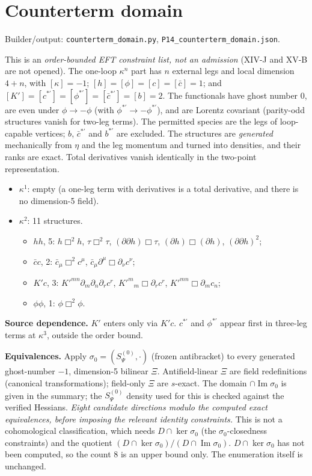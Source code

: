 \section{Counterterm domain}\label{sec:p14-ct}
\noindent Builder/output: \texttt{counterterm\_domain.py}, \texttt{P14\_counterterm\_domain.json}.\par\smallskip
This is an \emph{order-bounded EFT constraint list, not an admission} (XIV-J and XV-B are not opened). The one-loop
$\kappa^n$ part has $n$ external legs and local dimension $4+n$, with $[\kappa]=-1$; $[h]=[\phi]=[c]=[\bar c]=1$; and
$[K']=[c^{*\prime}]=[\phi^{*\prime}]=[\bar c^{*\prime}]=[b]=2$. The functionals have ghost number 0, are even under
$\phi\to-\phi$ (with $\phi^{*\prime}\to-\phi^{*\prime}$), and are Lorentz covariant (parity-odd structures vanish for
two-leg terms). The permitted species are the legs of loop-capable vertices; $b$, $\bar c^{*\prime}$ and $b^{*\prime}$
are excluded. The structures are \emph{generated} mechanically from $\eta$ and the leg momentum and turned into
densities, and their ranks are exact. Total derivatives vanish identically in the two-point representation.
\begin{itemize}
\item $\kappa^1$: empty (a one-leg term with derivatives is a total derivative, and there is no dimension-5 field).
\item $\kappa^2$: 11 structures.
\begin{itemize}
\item $hh$, 5: $h\Box^2h$, $\tau\Box^2\tau$, $(\partial\partial h)\Box\tau$, $(\partial h)\Box(\partial h)$,
$(\partial\partial h)^2$;
\item $\bar cc$, 2: $\bar c_\mu\Box^2c^\mu$, $\bar c_\mu\partial^\mu\Box\partial_\nu c^\nu$;
\item $K'c$, 3: $K'^{mn}\partial_m\partial_n\partial_rc^r$, $K'^m{}_m\Box\partial_rc^r$, $K'^{mn}\Box\partial_mc_n$;
\item $\phi\phi$, 1: $\phi\Box^2\phi$.
\end{itemize}
\end{itemize}
\textbf{Source dependence.} $K'$ enters only via $K'c$. $c^{*\prime}$ and $\phi^{*\prime}$ appear first in three-leg terms
at $\kappa^3$, outside the order bound.

\textbf{Equivalences.} Apply $\sigma_0=(S^{(0)}_\Psi,\cdot)$ (frozen antibracket) to every generated ghost-number $-1$,
dimension-5 bilinear $\Xi$. Antifield-linear $\Xi$ are field redefinitions (canonical transformations); field-only $\Xi$
are $s$-exact. The domain $\cap\operatorname{Im}\sigma_0$ is given in the summary; the $S^{(0)}_\Psi$
density used for this is checked against the verified Hessians. \emph{Eight candidate directions modulo the computed exact
equivalences, before imposing the relevant identity constraints.} This is not a cohomological classification, which
needs $D\cap\ker\sigma_0$ (the $\sigma_0$-closedness constraints) and the quotient
$(D\cap\ker\sigma_0)/(D\cap\operatorname{Im}\sigma_0)$. $D\cap\ker\sigma_0$ has not been computed, so the count 8 is an
upper bound only. The enumeration itself is unchanged.


